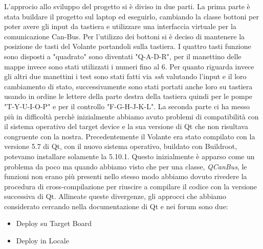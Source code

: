 L'approcio allo sviluppo del progetto si è diviso in due parti.
La prima parte è stata buildare il progetto sul laptop ed eseguirlo, 
cambiando la classe bottoni per poter avere gli input da tastiera e utilizzare 
una interfaccia virtuale per la comunicazione Can-Bus.
Per l'utilizzo dei bottoni si è deciso di mantenere la posizione de tasti del Volante portandoli sulla tastiera.
I quattro tasti funzione sono disposti a "quadrato" sono diventati "Q-A-D-R", 
per il manettino delle mappe invece sono stati utilizzati i numeri fino al 6.
Per quanto riguarda invece gli altri due manettini i test sono stati fatti via \emph{ssh} valutando l'input 
e il loro cambiamento di stato, successivamente sono stati portati anche loro su tastiera usando in ordine 
le lettere della parte destra della tastiera quindi per le pompe "T-Y-U-I-O-P" e per il controllo "F-G-H-J-K-L".    
La seconda parte ci ha messo più in difficoltà perchè inizialmente abbiamo avuto problemi di compatibilità 
con il sistema operativo del target device e la sua versione di Qt che non risultava congruente con la nostra.
Precedentemente il Volante era stato compilato con la versione 5.7 di Qt, con il nuovo sistema operativo, buildato
con Buildroot, potevamo installare solamente la 5.10.1. 
Questo inizialmente è apparso come un problema da poco ma quando abbiamo visto che per una classe, \emph{QCanBus}, 
le funzioni non erano più presenti nello stesso modo abbiamo dovuto rivedere la procedura di cross-compilazione per
riuscire a compilare il codice con la versione successiva di Qt. 
Allineate queste divergenze, gli approcci che abbiamo considerato cercando nella documentazione di Qt e nei forum
sono due:

\begin{itemize}
    \item Deploy su Target Board
    \item Deploy in Locale 
\end{itemize}

